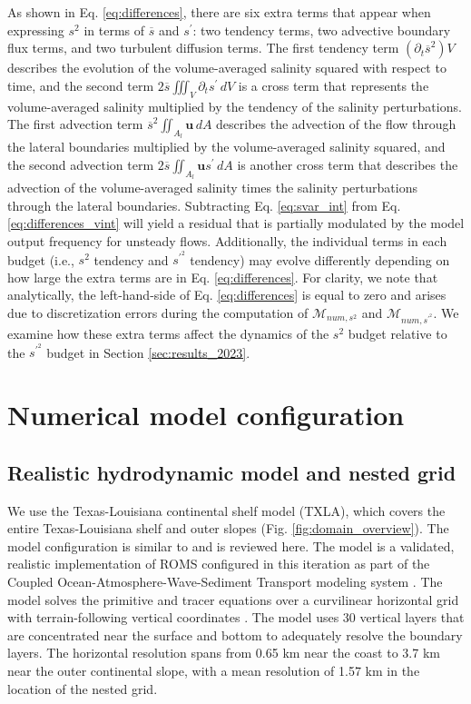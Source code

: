 As shown in Eq. \ref{eq:differences}, there are six extra terms that appear when expressing $s^2$ in terms of $\overline{s}$ and $s^{\prime}$: two tendency terms, two advective boundary flux terms, and two turbulent diffusion terms. The first tendency term $(\partial_t \overline{s}^2) V$ describes the evolution of the volume-averaged salinity squared with respect to time, and the second term $2\overline{s} \iiint_V \partial_t s^\prime \, dV$ is a cross term that represents the volume-averaged salinity multiplied by the tendency of the salinity perturbations. The first advection term $\overline{s}^2 \iint_{A_l} \mathbf{u} \, dA$ describes the advection of the flow through the lateral boundaries multiplied by the volume-averaged salinity squared, and the second advection term $2 \overline{s} \iint_{A_l} \textbf{u}s^{\prime} \, dA$ is another cross term that describes the advection of the volume-averaged salinity times the salinity perturbations through the lateral boundaries. Subtracting Eq. \ref{eq:svar_int} from Eq. \ref{eq:differences_vint} will yield a residual that is partially modulated by the model output frequency for unsteady flows. Additionally, the individual terms in each budget (i.e., $s^2$ tendency and $s^{\prime^2}$ tendency) may evolve differently depending on how large the extra terms are in Eq. \ref{eq:differences}. For clarity, we note that analytically, the left-hand-side of Eq. \ref{eq:differences} is equal to zero and arises due to discretization errors during the computation of $\mathcal{M}_{num, s^2}$ and $\mathcal{M}_{num, s^{\prime^2}}$.  We examine how these extra terms affect the dynamics of the $s^2$ budget relative to the $s^{\prime^2}$ budget in Section \ref{sec:results_2023}.

\section{Numerical model configuration} \label{sec:numerical}

\subsection{Realistic hydrodynamic model and nested grid}

We use the Texas-Louisiana continental shelf model (TXLA), which covers the entire Texas-Louisiana shelf and outer slopes (Fig. \ref{fig:domain_overview}). The model configuration is similar to \citet{Qu_2022_NIW} and is reviewed here. The model is a validated, realistic implementation of ROMS configured in this iteration as part of the Coupled Ocean-Atmosphere-Wave-Sediment Transport modeling system \citep{Warner_2010}. The model solves the primitive and tracer equations over a curvilinear horizontal grid with terrain-following vertical coordinates \citep{Arakawa_1977, shchepetkin2005regional, Zhang_2012_forecast}. The model uses 30 vertical layers that are concentrated near the surface and bottom to adequately resolve the boundary layers. The horizontal resolution spans from 0.65 km near the coast to 3.7 km near the outer continental slope, with a mean resolution of 1.57 km in the location of the nested grid. 

